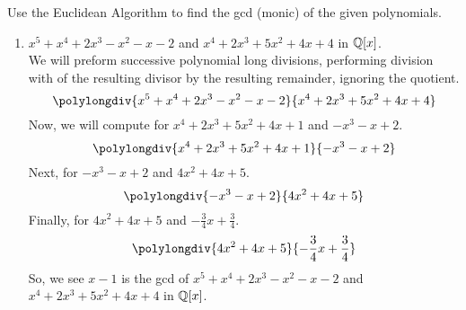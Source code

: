 \documentclass[../hw4]{subfiles}
\begin{document}
\begin{problem}
Use the Euclidean Algorithm to find the gcd (monic) of the given polynomials.
\begin{enumerate}[label=\roman*)]
	\item ${x^5+x^4+2x^3-x^2-x-2}$ and ${x^4+2x^3+5x^2+4x+4}$ in $\mathbb{Q}[x]$. \\
	      We will preform successive polynomial long divisions, performing division with of the resulting divisor by the resulting remainder, ignoring the quotient.
	      \[\polylongdiv{x^5+x^4+2x^3-x^2-x-2}{x^4+2x^3+5x^2+4x+4}\]
	      Now, we will compute for $x^4+2x^3 + 5x^2 + 4x + 1$ and $-x^3-x + 2$.
	      \[\polylongdiv{x^4+2x^3+5x^2+4x+1}{-x^3-x+2}\]
	      Next, for $-x^3-x+2$ and $4x^2 + 4x + 5$.
	      \[\polylongdiv{-x^3-x+2}{4x^2+4x+5}\]
	      Finally, for $4x^2 + 4x+5$ and $-\frac{3}{4}x + \frac{3}{4}$.
	      \[\polylongdiv{4x^2+4x+5}{-\frac{3}{4}x+\frac{3}{4}}\]
	      So, we see $x-1$ is the gcd of ${x^5+x^4+2x^3-x^2-x-2}$ and ${x^4+2x^3+5x^2+4x+4}$ in $\mathbb{Q}[x]$.


\end{enumerate}
\end{problem}
\end{document}
